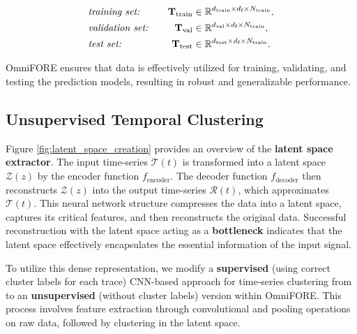 \begin{equation}
\begin{aligned}
&\text{\textit{training set:}} \quad  & \mathbf{T}_{\text{train}} &\in \mathbb{R}^{d_{\text{train}} \times d_{\text{f}} \times N_{\text{train}}}, \\
&\text{\textit{validation set:}} \quad & \mathbf{T}_{\text{val}} &\in \mathbb{R}^{d_{\text{val}} \times d_{\text{f}} \times N_{\text{train}}}, \\
&\text{\textit{test set:}} \quad & \mathbf{T}_{\text{test}} &\in \mathbb{R}^{d_{\text{test}} \times d_{\text{f}} \times N_{\text{train}}}.
\end{aligned} 
\end{equation}

OmniFORE ensures that data is effectively utilized for training, validating, and testing the prediction models, resulting in robust and generalizable performance.

\subsection{Unsupervised Temporal Clustering}
\label{sec: Unsupervised Temporal Clustering}

Figure \ref{fig:latent_space_creation} provides an overview of the \textbf{latent space extractor}. The input time-series $\mathcal{T}(t)$ is transformed into a latent space $\mathcal{Z}(z)$ by the encoder function $f_{\text{encoder}}$. The decoder function $f_{\text{decoder}}$ then reconstructs $\mathcal{Z}(z)$ into the output time-series $\mathcal{R}(t)$, which approximates $\mathcal{T}(t)$. This neural network structure compresses the data into a latent space, captures its critical features, and then reconstructs the original data. Successful reconstruction with the latent space acting as a \textbf{bottleneck} indicates that the latent space effectively encapsulates the essential information of the input signal.

To utilize this dense representation, we modify a \textbf{supervised} (using correct cluster labels for each trace) CNN-based approach for time-series clustering from \cite{clusteringDL} to an \textbf{unsupervised} (without cluster labels) version within OmniFORE. This process involves feature extraction through convolutional and pooling operations on raw data, followed by clustering in the latent space.


